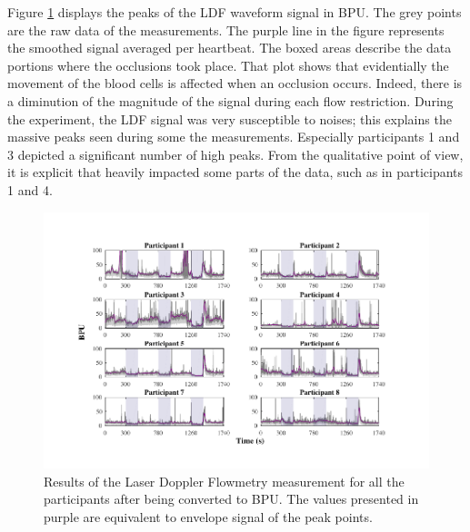 Figure \ref{fig:LDF flow} displays the peaks of the LDF waveform signal in BPU. The grey points are the raw data of the measurements. The purple line in the figure represents the smoothed signal averaged per heartbeat. The boxed areas describe the data portions where the occlusions took place. That plot shows that evidentially the movement of the blood cells is affected when an occlusion occurs. Indeed, there is a diminution of the magnitude of the signal during each flow restriction. During the experiment, the LDF signal was very susceptible to noises; this explains the massive peaks seen during some the measurements. Especially participants 1 and 3 depicted a significant number of high peaks. From the qualitative point of view, it is explicit that heavily impacted some parts of the data, such as in participants 1 and 4.

\begin{figure}[!htb]
	\centering
	\includegraphics[width=\textwidth,keepaspectratio,trim={1cm 0cm 1.5cm 0cm},clip]{figure_cmp_3}    
	\caption[Results of the LDF in BPU]{Results of the Laser Doppler Flowmetry measurement for all the participants after being converted to BPU. The values presented in purple are equivalent to envelope signal of the peak points.}
	\label{fig:LDF flow}
\end{figure}

